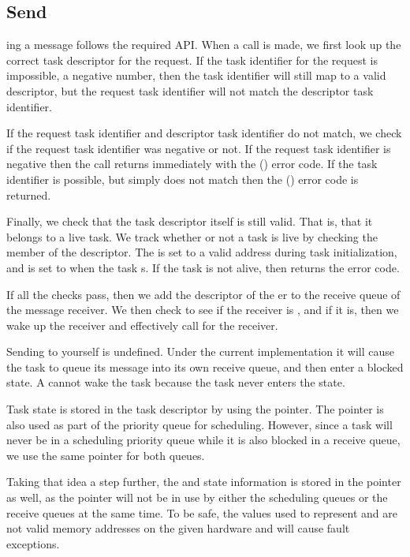 \documentclass[pdftex,10pt,a4paper]{article}
\begin{document}
\subsection*{Send}

ing a message follows the required API. When a 
call is made, we first look up the correct task descriptor for the
request. If the task identifier for the request is impossible, a
negative number, then the task identifier will still map to a valid
descriptor, but the request task identifier will not match the
descriptor task identifier.

If the request task identifier and descriptor task identifier do not
match, we check if the request task identifier was negative or not. If
the request task identifier is negative then the  call
returns immediately with the  () error
code. If the task identifier is possible, but simply does not match
then the  () error code is returned.

Finally, we check that the task descriptor itself is still valid. That
is, that it belongs to a live task. We track whether or not a task
is live by checking the  member of the descriptor. The
 is set to a valid address during task initialization, and is
set to  when the task s. If the task is not alive,
then  returns the  error code.

If all the checks pass, then we add the descriptor of the er
to the receive queue of the message receiver. We then check to see if
the receiver is , and if it is, then we wake up the
receiver and effectively call  for the receiver.



Sending to yourself is undefined. Under the current implementation it
will cause the task to queue its message into its own receive queue,
and then enter a blocked state. A  cannot wake the task
because the task never enters the  state.

Task state is stored in the task descriptor by using the 
pointer. The  pointer is also used as part of the priority
queue for scheduling. However, since a task will never be in a
scheduling priority queue while it is also blocked in a receive queue,
we use the same  pointer for both queues.

Taking that idea a step further, the  and
 state information is stored in the 
pointer as well, as the  pointer will not be in use by
either the scheduling queues or the receive queues at the same
time. To be safe, the values used to represent  and
 are not valid memory addresses on the given
hardware and will cause fault exceptions.
\end{document}
